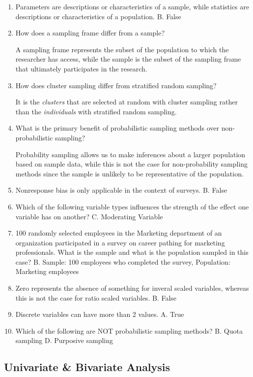 \documentclass[]{book}
\begin{document}
\begin{enumerate}
\def\labelenumi{\arabic{enumi}.}
\item
  Parameters are descriptions or characteristics of a sample, while statistics are descriptions or characteristics of a population.
  B. False
\item
  How does a sampling frame differ from a sample?

  A sampling frame represents the subset of the population to which the researcher has access, while the sample is the subset of the sampling frame that ultimately participates in the research.
\item
  How does cluster sampling differ from stratified random sampling?

  It is the \emph{clusters} that are selected at random with cluster sampling rather than the \emph{individuals} with stratified random sampling.
\item
  What is the primary benefit of probabilistic sampling methods over non-probabilistic sampling?

  Probability sampling allows us to make inferences about a larger population based on sample data, while this is not the case for non-probability sampling methods since the sample is unlikely to be representative of the population.
\item
  Nonresponse bias is only applicable in the context of surveys.
  B. False
\item
  Which of the following variable types influences the strength of the effect one variable has on another?
  C. Moderating Variable
\item
  100 randomly selected employees in the Marketing department of an organization participated in a survey on career pathing for marketing professionals. What is the sample and what is the population sampled in this case?
  B. Sample: 100 employees who completed the survey, Population: Marketing employees
\item
  Zero represents the absence of something for inveral scaled variables, whereas this is not the case for ratio scaled variables.
  B. False
\item
  Discrete variables can have more than 2 values.
  A. True
\item
  Which of the following are NOT probabilistic sampling methods?
  B. Quota sampling
  D. Purposive sampling
\end{enumerate}

\hypertarget{univariate-bivariate-analysis}{%
\subsection{Univariate \& Bivariate Analysis}\label{univariate-bivariate-analysis}}
\end{document}
